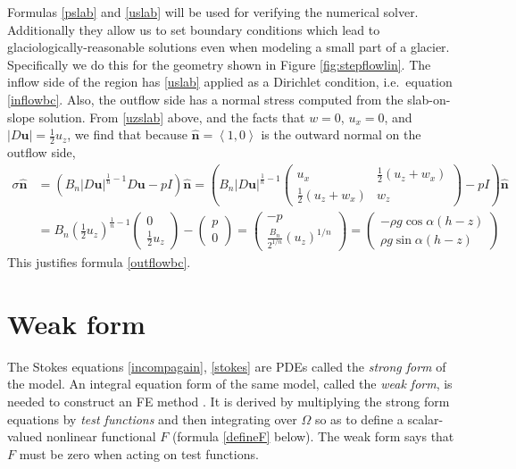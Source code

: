 \documentclass[letterpaper,final,12pt,reqno]{amsart}
\newcommand{\hbn}{\hat{\mathbf{n}}}
\newcommand{\bu}{\mathbf{u}}
\begin{document}
Formulas \eqref{pslab} and \eqref{uslab} will be used for verifying the numerical solver.  Additionally they allow us to set boundary conditions which lead to glaciologically-reasonable solutions even when modeling a small part of a glacier.  Specifically we do this for the geometry shown in Figure \ref{fig:stepflowlin}.  The inflow side of the region has \eqref{uslab} applied as a Dirichlet condition, i.e.~equation \eqref{inflowbc}.  Also, the outflow side has a normal stress computed from the slab-on-slope solution.  From \eqref{uzslab} above, and the facts that $w=0$, $u_x=0$, and $|D\bu| = \frac{1}{2} u_z$, we find that because $\hbn=\left<1,0\right>$ is the outward normal on the outflow side,
\begin{align*}
\sigma \hbn &= \left(B_n |D\bu|^{\frac{1}{n}-1} D\bu - pI\right)\hbn = \left(B_n |D\bu|^{\frac{1}{n}-1} \begin{pmatrix} u_x & \frac{1}{2}(u_z+w_x) \\ \frac{1}{2}(u_z+w_x) & w_z \end{pmatrix} - pI\right)\hbn \\
    &= B_n \left(\frac{1}{2} u_z\right)^{\frac{1}{n}-1} \begin{pmatrix} 0 \\ \frac{1}{2} u_z \end{pmatrix} - \begin{pmatrix} p \\ 0 \end{pmatrix} = \begin{pmatrix} - p \\ \frac{B_n}{2^{1/n}} (u_z)^{1/n} \end{pmatrix} = \begin{pmatrix} - \rho g\cos\alpha (h-z) \\ \rho g\sin\alpha (h-z) \end{pmatrix}
\end{align*}
This justifies formula \eqref{outflowbc}.


\section{Weak form}

The Stokes equations \eqref{incompagain}, \eqref{stokes} are PDEs called the \emph{strong form} of the model.  An integral equation form of the same model, called the \emph{weak form}, is needed to construct an FE method \cite{Elmanetal2014}.  It is derived by multiplying the strong form equations by \emph{test functions} and then integrating over $\Omega$ so as to define a scalar-valued nonlinear functional $F$ (formula \eqref{defineF} below).  The weak form says that $F$ must be zero when acting on test functions.
\end{document}
